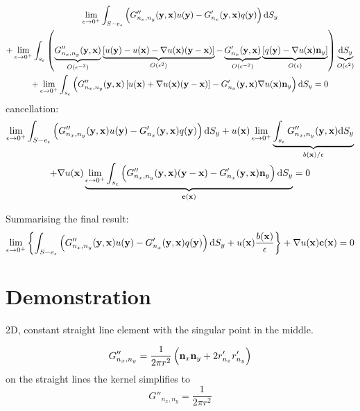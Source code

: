 \documentclass[a4paper,11pt]{article}
\newcommand{\td}{\mathrm{d}}
\begin{document}
%
\begin{multline}
\lim_{\epsilon \to 0^+}
\int_{S-e_{\epsilon}}
\left(
G''_{n_x,n_y}({\bf y}, {\bf x}) u({\bf y})
- G'_{n_x}({\bf y}, {\bf x}) q({\bf y})
\right)
\td S_y
\\
+
\lim_{\epsilon \to 0^+}
\int_{s_{\epsilon}}
\left(
\underbrace{G''_{n_x,n_y}({\bf y}, {\bf x})}_{O(\epsilon^{-3})} \underbrace{\left[u({\bf y}) - u({\bf x}) - \nabla u({\bf x}) ({\bf y} - {\bf x})\right]}_{O(\epsilon^2)}
- \underbrace{G'_{n_x}({\bf y}, {\bf x})}_{O(\epsilon^{-2})} \underbrace{\left[q({\bf y}) - \nabla u({\bf x}) {\bf n}_y\right]}_{O(\epsilon)}
\right)
\underbrace{\td S_y}_{O(\epsilon^2)}
\\
+
\lim_{\epsilon \to 0^+}
\int_{s_{\epsilon}}
\left(
G''_{n_x,n_y}({\bf y}, {\bf x}) \left[u({\bf x}) + \nabla u({\bf x}) ({\bf y} - {\bf x})\right]
- G'_{n_x}({\bf y}, {\bf x}) \nabla u({\bf x}) {\bf n}_y
\right)
\td S_y = 0
\end{multline}
%
cancellation:
%
\begin{multline}
\lim_{\epsilon \to 0^+}
\int_{S-e_{\epsilon}}
\left(
G''_{n_x,n_y}({\bf y}, {\bf x}) u({\bf y})
- G'_{n_x}({\bf y}, {\bf x}) q({\bf y})
\right)
\td S_y
+
u({\bf x})
\lim_{\epsilon \to 0^+}
\underbrace{
\int_{s_{\epsilon}}
G''_{n_x,n_y}({\bf y}, {\bf x}) 
\td S_y
}_{b({\bf x})/\epsilon}
\\
+
\nabla u({\bf x}) 
\underbrace{
\lim_{\epsilon \to 0^+}
\int_{s_{\epsilon}}
\left(
G''_{n_x,n_y}({\bf y}, {\bf x}) ({\bf y} - {\bf x})
- G'_{n_x}({\bf y}, {\bf x}) {\bf n}_y
\right)
\td S_y
}_{\bf c({\bf x})}
= 0
\end{multline}
%

Summarising the final result:
%
\begin{equation}
\lim_{\epsilon \to 0^+}
\left\{
\int_{S-e_{\epsilon}}
\left(
G''_{n_x,n_y}({\bf y}, {\bf x}) u({\bf y})
- G'_{n_x}({\bf y}, {\bf x}) q({\bf y})
\right)
\td S_y
+
u({\bf x})
\frac{b({\bf x})}{\epsilon}
\right\}
+
\nabla u({\bf x}) 
{\bf c}({\bf x})
= 0
\end{equation}


\section{Demonstration}


2D, constant straight line element with the singular point in the middle.

\begin{equation}
G''_{n_x, n_y} = \frac{1}{2\pi r^2} \left({\bf n}_x {\bf n}_y + 2 r'_{n_x} r'_{n_y}\right)
\end{equation}
%
on the straight lines the kernel simplifies to
%
\begin{equation}
G''_{n_x, n_y} = \frac{1}{2\pi r^2}
\end{equation}
\end{document}
